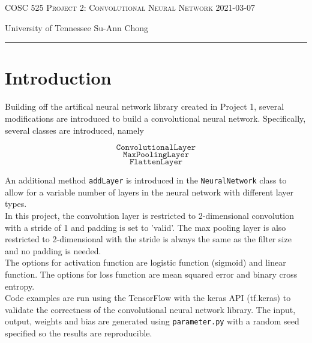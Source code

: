 \documentclass[12pt]{amsart}
\begin{document}
\thispagestyle{empty}

{\scshape COSC 525} \hfill {\scshape \large Project 2: Convolutional Neural Network} \hfill {\scshape 2021-03-07}

\smallskip 

{University of Tennessee} \hfill { Su-Ann Chong}

\smallskip

\hrule

\bigskip
\section{Introduction}
Building off the artifical neural network library created in Project 1, several modifications are introduced to build a convolutional neural network. Specifically, several classes are introduced, namely

$$ \texttt{ConvolutionalLayer} $$
$$  \texttt{MaxPoolingLayer} $$
$$ \texttt{FlattenLayer} $$  

\bigskip

An additional method \texttt{addLayer} is introduced in the \texttt{NeuralNetwork} class to allow for a variable number of layers in the neural network with different layer types. \\


In this project, the convolution layer is restricted to 2-dimensional convolution with a stride of 1 and padding is set to 'valid'. The max pooling layer is also restricted to 2-dimensional with the stride is always the same as the filter size and no padding is needed. \\

The options for activation function are logistic function (sigmoid) and linear function. The options for loss function are mean squared error and binary cross entropy. \\

Code examples are run using the TensorFlow with the keras API (tf.keras) to validate the correctness of the convolutional neural network library. The input, output, weights and bias are generated using \texttt{parameter.py} with a random seed specified so the results are reproducible. 
\end{document}
